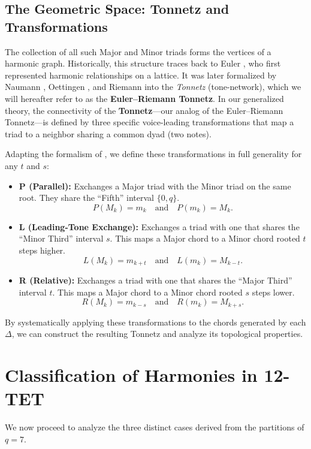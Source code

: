 \documentclass[12pt,letterpaper]{amsart}
\begin{document}
\subsection{The Geometric Space: Tonnetz and Transformations}
The collection of all such Major and Minor triads forms the vertices of a harmonic graph. Historically, this structure traces back to Euler \cite{Euler1739}, who first represented harmonic relationships on a lattice. It was later formalized by Naumann \cite{Naumann1858}, Oettingen \cite{Oettingen1866}, and Riemann \cite{Riemann1893,Riemann1914} into the \emph{Tonnetz} (tone-network), which we will hereafter refer to as the \textbf{Euler--Riemann Tonnetz}. In our generalized theory, the connectivity of the \textbf{Tonnetz}---our analog of the Euler--Riemann Tonnetz---is defined by three specific voice-leading transformations that map a triad to a neighbor sharing a common dyad (two notes).


Adapting the formalism of \cite{Riemann1893}, we define these transformations in full generality for any $t$ and $s$:
\begin{itemize}
    \item \textbf{P (Parallel):} Exchanges a Major triad with the Minor triad on the same root. They share the ``Fifth'' interval $\{0, q\}$.
    $$ P(M_k) = m_k \quad \text{and} \quad P(m_k) = M_k. $$
    \item \textbf{L (Leading-Tone Exchange):} Exchanges a triad with one that shares the ``Minor Third'' interval $s$. This maps a Major chord to a Minor chord rooted $t$ steps higher.
    $$ L(M_k) = m_{k+t} \quad \text{and} \quad L(m_k) = M_{k-t}. $$
    \item \textbf{R (Relative):} Exchanges a triad with one that shares the ``Major Third'' interval $t$. This maps a Major chord to a Minor chord rooted $s$ steps lower.
    $$ R(M_k) = m_{k-s} \quad \text{and} \quad R(m_k) = M_{k+s}. $$
\end{itemize}
By systematically applying these transformations to the chords generated by each $\Delta$, we can construct the resulting Tonnetz and analyze its topological properties.

\section{Classification of Harmonies in 12-TET}

We now proceed to analyze the three distinct cases derived from the partitions of $q=7$.
\end{document}
